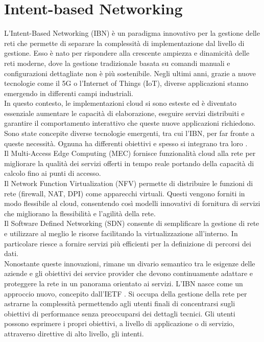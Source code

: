 \section{Intent-based Networking}
\label{ch:IBN}
L'Intent-Based Networking (IBN) è un paradigma innovativo per la gestione delle reti che permette di separare la complessità di implementazione dal livello di gestione.
Esso è nato per rispondere alla crescente ampiezza e dinamicità delle reti moderne, dove la gestione tradizionale basata su comandi manuali e configurazioni dettagliate non è più sostenibile.
Negli ultimi anni, grazie a nuove tecnologie come il 5G o l'Internet of Things (IoT), diverse applicazioni stanno emergendo in differenti campi industriali.
\\In questo contesto, le implementazioni cloud si sono esteste ed è diventato essenziale aumentare le capacità di elaborazione, eseguire servizi distribuiti e garantire il 
comportamento interattivo che queste nuove applicazioni richiedono.
Sono state concepite diverse tecnologie emergenti, tra cui l'IBN, per far fronte a queste necessità. Ognuna ha differenti obiettivi e spesso si integrano tra loro \cite{ibn}.
\\Il Multi-Access Edge Computing (MEC) fornisce funzionalità cloud alla rete per migliorare la qualità dei servizi offerti in tempo reale portando della capacità di calcolo fino ai punti di accesso.
\\Il Network Function Virtualization (NFV) permette di distribuire le funzioni di rete (firewall, NAT, DPI) come apparecchi virtuali. Questi vengono forniti in modo flessibile al cloud, consentendo 
così modelli innovativi di fornitura di servizi che migliorano la flessibilità e l'agilità della rete.
\\Il Software Defined Networking (SDN) consente di semplificare la gestione di rete e utilizzare al meglio le risorse facilitando la virtualizzazione all'interno. In particolare riesce a 
fornire servizi più efficienti per la definizione di percorsi dei dati.
\\Nonostante queste innovazioni, rimane un divario semantico tra le esigenze delle aziende e gli obiettivi dei service provider che devono continuamente adattare e proteggere la rete in un panorama orientato ai servizi.
L'IBN nasce come un approccio nuovo, concepito dall'IETF \cite{ietf}. Si occupa della gestione della rete per astrarne la complessità permettendo agli utenti finali di concentrarsi sugli obiettivi di performance senza preoccuparsi dei dettagli tecnici.
Gli utenti possono esprimere i propri obiettivi, a livello di applicazione o di servizio, attraverso direttive di alto livello, gli intenti.
